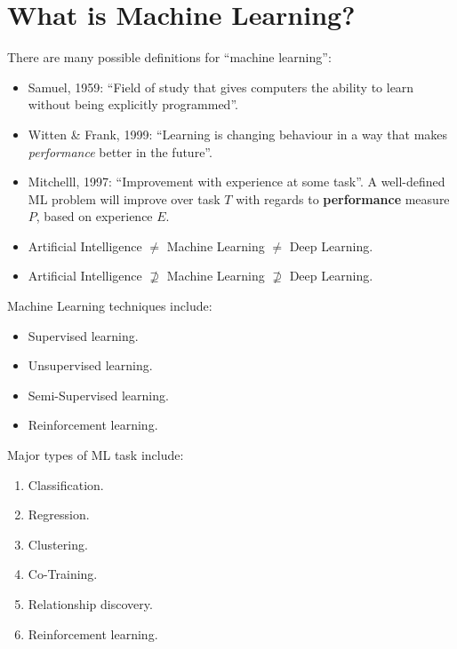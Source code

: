 \documentclass[a4paper,11pt]{article}
\begin{document}
\section{What is Machine Learning?}
There are many possible definitions for ``machine learning'':
\begin{itemize}
    \item   Samuel, 1959: ``Field of study that gives computers the ability to learn without being explicitly 
            programmed''.
    \item   Witten \& Frank, 1999: ``Learning is changing behaviour in a way that makes \textit{performance} better
            in the future''.
    \item   Mitchelll, 1997: ``Improvement with experience at some task''. 
            A well-defined ML problem will improve over task $T$ with regards to \textbf{performance} measure $P$,
            based on experience $E$.
    \item   Artificial Intelligence $\neq$ Machine Learning $\neq$ Deep Learning.
    \item   Artificial Intelligence $\not \supseteq$ Machine Learning $\not \supseteq$ Deep Learning.
\end{itemize}

Machine Learning techniques include:
\begin{itemize}
    \item   Supervised learning.
    \item   Unsupervised learning.
    \item   Semi-Supervised learning.
    \item   Reinforcement learning.
\end{itemize}

Major types of ML task include:
\begin{enumerate}
    \item   Classification.
    \item   Regression.
    \item   Clustering.
    \item   Co-Training.
    \item   Relationship discovery.
    \item   Reinforcement learning.
\end{enumerate}
\end{document}
